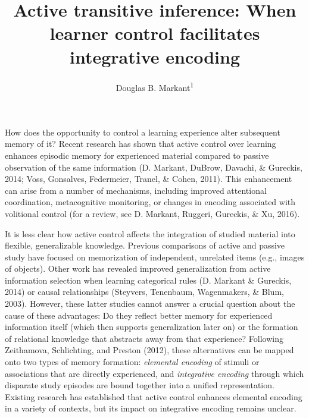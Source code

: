 \documentclass[floatsintext,man]{apa6}
\title{Active transitive inference: When learner control facilitates
integrative encoding}
\author{Douglas B. Markant\textsuperscript{1}}
\affiliation{
    \vspace{0.5cm}
          \textsuperscript{1} Department of Psychological Science, University of North Carolina at
Charlotte  }
\theoremstyle{definition}
\theoremstyle{definition}
\theoremstyle{definition}
\theoremstyle{remark}
\begin{document}
\maketitle

\setcounter{secnumdepth}{0}



How does the opportunity to control a learning experience alter
subsequent memory of it? Recent research has shown that active control
over learning enhances episodic memory for experienced material compared
to passive observation of the same information (D. Markant, DuBrow,
Davachi, \& Gureckis, 2014; Voss, Gonsalves, Federmeier, Tranel, \&
Cohen, 2011). This enhancement can arise from a number of mechanisms,
including improved attentional coordination, metacognitive monitoring,
or changes in encoding associated with volitional control (for a review,
see D. Markant, Ruggeri, Gureckis, \& Xu, 2016).

It is less clear how active control affects the integration of studied
material into flexible, generalizable knowledge. Previous comparisons of
active and passive study have focused on memorization of independent,
unrelated items (e.g., images of objects). Other work has revealed
improved generalization from active information selection when learning
categorical rules (D. Markant \& Gureckis, 2014) or causal relationships
(Steyvers, Tenenbaum, Wagenmakers, \& Blum, 2003). However, these latter
studies cannot answer a crucial question about the cause of these
advantages: Do they reflect better memory for experienced information
itself (which then supports generalization later on) or the formation of
relational knowledge that abstracts away from that experience? Following
Zeithamova, Schlichting, and Preston (2012), these alternatives can be
mapped onto two types of memory formation: \emph{elemental encoding} of
stimuli or associations that are directly experienced, and
\emph{integrative encoding} through which disparate study episodes are
bound together into a unified representation. Existing research has
established that active control enhances elemental encoding in a variety
of contexts, but its impact on integrative encoding remains unclear.
\end{document}
